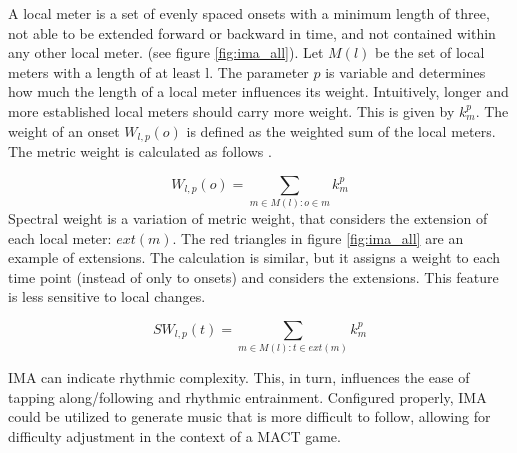 A local meter is a set of evenly spaced onsets with a minimum length of three, not able to be extended forward or backward in time, and not contained within any other local meter. (see figure \ref{fig:ima_all}). Let $M(l)$ be the set of local meters with a length of at least l. The parameter $p$ is variable and determines how much the length of a local meter influences its weight. Intuitively, longer and more established local meters should carry more weight. This is given by $k_{m}^p$. The weight of an onset $W_{l,p}(o)$ is defined as the weighted sum of the local meters.  
The metric weight is calculated as follows \cite{Volk2008Syncopation}.  

\begin{equation}
 W_{l,p}(o) = \sum_{m \in M(l):o \in m}k_{m}^{p}
\end{equation} 
Spectral weight is a variation of metric weight, that considers the extension of each local meter: $ext(m)$. The red triangles in figure \ref{fig:ima_all} are an example of extensions. The calculation is similar, but it assigns a weight to each time point (instead of only to onsets) and considers the extensions. This feature is less sensitive to local changes.

\begin{equation}
 SW_{l,p}(t) = \sum_{m \in M(l):t \in ext(m)}k_{m}^{p}
\end{equation}

IMA can indicate rhythmic complexity. This, in turn, influences the ease of tapping along/following \cite{Volk2008Syncopation} and rhythmic entrainment. Configured properly, IMA could be utilized to generate music that is more difficult to follow, allowing for difficulty adjustment in the context of a MACT game. 


